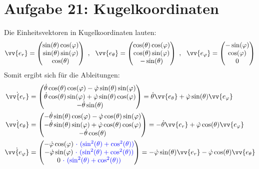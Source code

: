 \documentclass[a4paper,12pt]{article}
\begin{document}
\section*{Aufgabe 21: Kugelkoordinaten}
Die Einheitsvektoren in Kugelkoordinaten lauten:
\begin{align*}
\vv{e_r}=\begin{pmatrix} \sin(\theta)\cos(\varphi)\\\sin(\theta)\sin(\varphi) \\ \cos(\theta) \end{pmatrix}\ ,\ \ \vv{e_{\theta}}=\begin{pmatrix} \cos(\theta)\cos(\varphi)\\\cos(\theta)\sin(\varphi) \\ -\sin(\theta) \end{pmatrix}\ ,\ \ \vv{e_{\varphi}}=\begin{pmatrix} -\sin(\varphi)\\ \cos(\varphi) \\ 0 \end{pmatrix}
\end{align*}
Somit ergibt sich für die Ableitungen:
\begin{align*}
\dot{\vv{e_r}}&=\begin{pmatrix} \dot{\theta}\cos(\theta)\cos(\varphi)-\dot{\varphi}\sin(\theta)\sin(\varphi)\\ \dot{\theta}\cos(\theta)\sin(\varphi)+\dot{\varphi}\sin(\theta)\cos(\varphi) \\ -\dot{\theta}\sin(\theta) \end{pmatrix} = \dot{\theta}\vv{e_{\theta}}+\dot{\varphi}\sin(\theta)\vv{e_{\varphi}}\\
\dot{\vv{e_{\theta}}}&=\begin{pmatrix} -\dot{\theta}\sin(\theta)\cos(\varphi)-\dot{\varphi}\cos(\theta)\sin(\varphi)\\ -\dot{\theta}\sin(\theta)\sin(\varphi)+\dot{\varphi}\cos(\theta)\cos(\varphi) \\ -\dot{\theta}\cos(\theta) \end{pmatrix}=-\dot{\theta}\vv{e_r}+\dot{\varphi}\cos(\theta)\vv{e_{\varphi}}\\
\dot{\vv{e_{\varphi}}}&=\begin{pmatrix} -\dot{\varphi}\cos(\varphi)\ \color{blue}{\cdot\ (\sin^2(\theta)+\cos^2(\theta))}\\ -\dot{\varphi}\sin(\varphi)\ \color{blue}{\cdot\ (\sin^2(\theta)+\cos^2(\theta))} \\ 0\ \color{blue}{\cdot\ (\sin^2(\theta)+\cos^2(\theta))} \end{pmatrix} =  -\dot{\varphi}\sin(\theta)\vv{e_r}-\dot{\varphi}\cos(\theta)\vv{e_{\theta}}
\end{align*}
\end{document}
